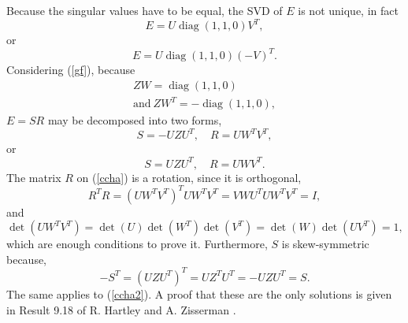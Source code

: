 Because the singular values have to be equal, the SVD of $E$ is not unique, in fact 
\begin{equation}
\label{gf}
E = U \operatorname { diag } ( 1,1,0 ) V ^ { T },
\end{equation}
or 
\begin{equation}
E = U \operatorname { diag } ( 1,1,0 ) ( - V ) ^ { T }.
\end{equation} 
Considering (\ref{gf}), because
\begin{equation}
\begin{aligned} 
Z W = \operatorname { diag } ( 1,1,0 ) \\ 
\text{and} \
Z W ^ { T } = - \operatorname { diag } ( 1,1,0 ) ,
\end{aligned}
\end{equation}
$E=SR$ may be decomposed into two forms,
\begin{equation}
\label{ccha}
S = - U Z U ^ { T } , \quad R = U W ^ { T } V ^ { T },
\end{equation}
or
\begin{equation}
\label{ccha2}
S = U Z U ^ { T } , \quad R = U W V ^ { T }.
\end{equation}
The matrix $R$ on (\ref{ccha}) is a rotation, since it is orthogonal,
\begin{equation}
R ^ { T } R = \left( U W ^ { T } V ^ { T } \right) ^ { T } U W ^ { T } V ^ { T } = V W U ^ { T } U W ^ { T } V ^ { T } = I,
\end{equation}
and 
\begin{equation}
\operatorname { det } \left( U W ^ { T } V ^ { T } \right) = \operatorname { det } ( U ) \operatorname { det } \left( W ^ { T } \right) \operatorname { det } \left( V ^ { T } \right) = \operatorname { det } ( W ) \operatorname { det } \left( U V ^ { T } \right) = 1,
\end{equation}
which are enough conditions to prove it. Furthermore, $S$ is skew-symmetric because,
\begin{equation}
- S^ { T } = \left( U Z U ^ { T } \right) ^ { T } = U Z ^ { T } U ^ { T } = - U Z U ^ { T } = S.
\end{equation}
The same applies to (\ref{ccha2}). \cite{lecture} A proof that these are the only solutions is given in Result 9.18 of R. Hartley and A. Zisserman \cite{epipolar}.

